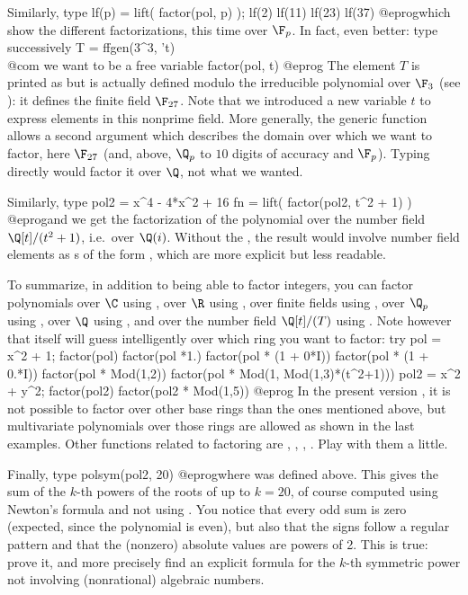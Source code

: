 Similarly, type
\bprog
  lf(p) = lift( factor(pol, p) );
  lf(2)
  lf(11)
  lf(23)
  lf(37)
@eprog\noindent which show the different factorizations, this time over
$\F_p$. In fact, even better: type successively
\bprog
  T = ffgen(3^3, 't) \\@com we want  to be a free variable
  factor(pol, t)
@eprog\noindent
The element $T$ is printed as  but is actually defined modulo the
irreducible polynomial  over $\F_{3}$ (see
): it defines the finite field $\F_{27}$. Note that we introduced
a new variable $t$ to express elements in this nonprime field.
More generally, the generic  function allows a second argument
which describes the domain over which we want to factor, here $\F_{27}$
(and, above, $\Q_p$ to $10$ digits of accuracy and $\F_p$).
Typing  directly would factor it over $\Q$, not what we
wanted.

Similarly, type
\bprog
  pol2 = x^4 - 4*x^2 + 16
  fn = lift( factor(pol2, t^2 + 1) )
@eprog\noindent and we get the factorization of the polynomial 
over the number field $\Q[t]/(t^2+1)$, i.e.~over $\Q(i)$. Without the
, the result would involve number field elements as s
of the form , which are more explicit but less
readable.
\smallskip

To summarize, in addition to being able to factor integers, you can factor
polynomials over $\C$ using , over $\R$ using
, over finite fields using
, over $\Q_p$ using ,
over $\Q$ using , and over the number field $\Q[t]/(T)$ using
.
Note however that  itself will guess intelligently over
which ring you want to factor: try
\bprog
  pol = x^2 + 1;
  factor(pol)
  factor(pol *1.)
  factor(pol * (1 + 0*I))
  factor(pol * (1 + 0.*I))
  factor(pol * Mod(1,2))
  factor(pol * Mod(1, Mod(1,3)*(t^2+1)))
  pol2 = x^2 + y^2;
  factor(pol2)
  factor(pol2 * Mod(1,5))
@eprog\noindent
In the present version \vers{}, it is not possible to factor over other
base rings than the ones mentioned above, but multivariate polynomials over
those rings are allowed as shown in the last examples. Other functions
related to factoring are , ,
, . Play with them a little.

Finally, type
\bprog
  polsym(pol2, 20)
@eprog\noindent where  was defined above. This gives the sum of the
$k$-th powers of the roots of  up to $k=20$, of course computed
using Newton's formula and not using . You notice that every
odd sum is zero (expected, since the polynomial is even), but also that
the signs follow a regular pattern and that the (nonzero) absolute values
are powers of 2. This is true: prove it, and more precisely find an explicit
formula for the $k$-th symmetric power not involving (nonrational) algebraic
numbers.

